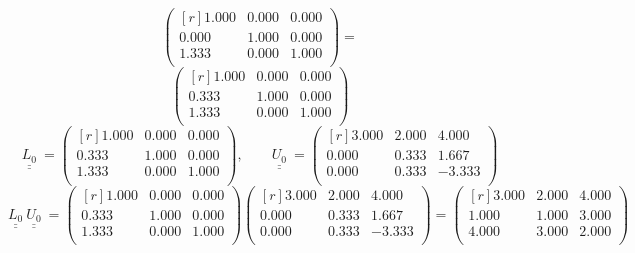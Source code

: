 \documentclass{report}[10pts]
\begin{document}
\begin{enumerate}[- Ex. 1]
\begin{itemize}
\[      \begin{pmatrix}[r]
         1.000 & 0.000 & 0.000\\
         0.000 & 1.000 & 0.000\\
         1.333 & 0.000 & 1.000\\
      \end{pmatrix}
   =
\]
\[
      \begin{pmatrix*}[r]
         1.000 & 0.000 & 0.000\\
         0.333 & 1.000 & 0.000\\
         1.333 & 0.000 & 1.000\\
      \end{pmatrix*}
\]
\[
   \underline{\underline{L_{0}}}~
   =
      \begin{pmatrix*}[r]
         1.000 & 0.000 & 0.000\\
         0.333 & 1.000 & 0.000\\
         1.333 & 0.000 & 1.000\\
      \end{pmatrix*}
   ,\qquad
   \underline{\underline{U_{0}}}~
   =
      \begin{pmatrix*}[r]
         3.000 & 2.000 & 4.000\\
         0.000 & 0.333 & 1.667\\
         0.000 & 0.333 & -3.333\\
      \end{pmatrix*}
\]
\[
   \underline{\underline{L_{0}}}~
   \underline{\underline{U_{0}}}~
   =
      \begin{pmatrix*}[r]
         1.000 & 0.000 & 0.000\\
         0.333 & 1.000 & 0.000\\
         1.333 & 0.000 & 1.000\\
      \end{pmatrix*}
      \begin{pmatrix*}[r]
         3.000 & 2.000 & 4.000\\
         0.000 & 0.333 & 1.667\\
         0.000 & 0.333 & -3.333\\
      \end{pmatrix*}
   =
      \begin{pmatrix*}[r]
         3.000 & 2.000 & 4.000\\
         1.000 & 1.000 & 3.000\\
         4.000 & 3.000 & 2.000\\
      \end{pmatrix*}
\]
\end{itemize}
\end{enumerate}
\end{document}
